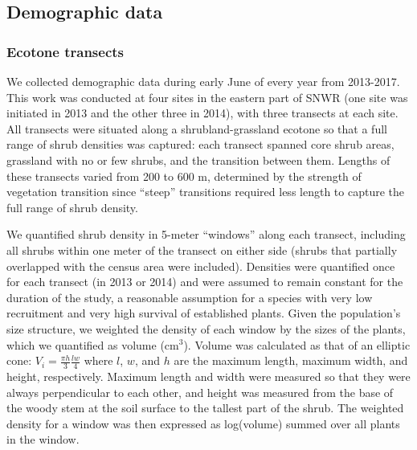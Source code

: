 \documentclass[11pt]{article}\usepackage[]{graphicx}\usepackage[usenames,dvipsnames]{xcolor}
\begin{document}
\subsection*{Demographic data}

\subsubsection*{Ecotone transects}

We collected demographic data during early June of every year from 2013-2017.
This work was conducted at four sites in the eastern part of SNWR (one site was initiated in 2013 and the other three in 2014), with three transects at each site. 
All transects were situated along a shrubland-grassland ecotone so that a full range of shrub densities was captured: each transect spanned core shrub areas, grassland with no or few shrubs, and the transition between them. 
Lengths of these transects varied from 200 to 600 m, determined by the strength of vegetation transition since ``steep'' transitions required less length to capture the full range of shrub density. 

We quantified shrub density in 5-meter ``windows'' along each transect, including all shrubs within one meter of the transect on either side (shrubs that partially overlapped with the census area were included).
Densities were quantified once for each transect (in 2013 or 2014) and were assumed to remain constant for the duration of the study, a reasonable assumption for a species with very low recruitment and very high survival of established plants. 
Given the population's size structure, we weighted the density of each window by the sizes of the plants, which we quantified as volume (cm$^3$).
Volume was calculated as that of an elliptic cone: $V_{i} = \frac{\pi h}{3} \frac{lw}{4}$ where $l$, $w$, and $h$ are the maximum length, maximum width, and height, respectively.
Maximum length and width were measured so that they were always perpendicular to each other, and height was measured from the base of the woody stem at the soil surface to the tallest part of the shrub.
The weighted density for a window was then expressed as log(volume) summed over all plants in the window.
\end{document}
